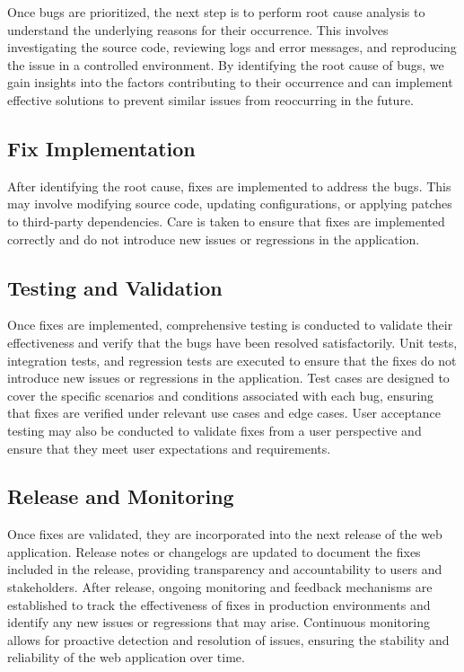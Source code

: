 \documentclass[12pt,a4paper]{report}
\begin{document}
Once bugs are prioritized, the next step is to perform root cause analysis to understand the underlying reasons for their occurrence. This involves investigating the source code, reviewing logs and error messages, and reproducing the issue in a controlled environment. By identifying the root cause of bugs, we gain insights into the factors contributing to their occurrence and can implement effective solutions to prevent similar issues from reoccurring in the future.

\subsection{Fix Implementation}

After identifying the root cause, fixes are implemented to address the bugs. This may involve modifying source code, updating configurations, or applying patches to third-party dependencies. Care is taken to ensure that fixes are implemented correctly and do not introduce new issues or regressions in the application.

\subsection{Testing and Validation}

Once fixes are implemented, comprehensive testing is conducted to validate their effectiveness and verify that the bugs have been resolved satisfactorily. Unit tests, integration tests, and regression tests are executed to ensure that the fixes do not introduce new issues or regressions in the application. Test cases are designed to cover the specific scenarios and conditions associated with each bug, ensuring that fixes are verified under relevant use cases and edge cases. User acceptance testing may also be conducted to validate fixes from a user perspective and ensure that they meet user expectations and requirements.

\subsection{Release and Monitoring}

Once fixes are validated, they are incorporated into the next release of the web application. Release notes or changelogs are updated to document the fixes included in the release, providing transparency and accountability to users and stakeholders. After release, ongoing monitoring and feedback mechanisms are established to track the effectiveness of fixes in production environments and identify any new issues or regressions that may arise. Continuous monitoring allows for proactive detection and resolution of issues, ensuring the stability and reliability of the web application over time.
\end{document}
